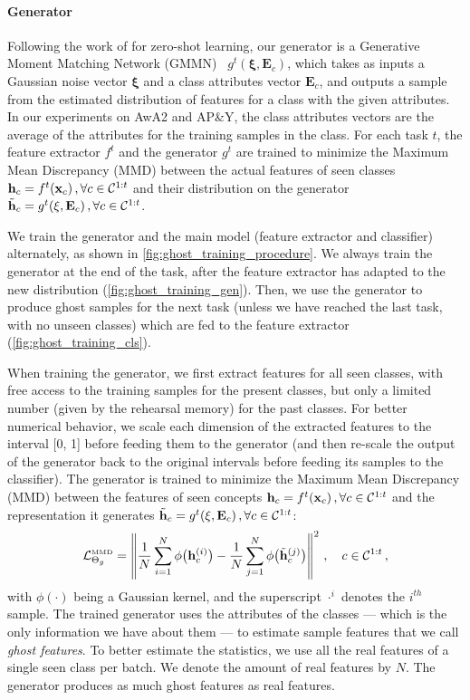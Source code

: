 \paragraph{Generator} Following the work of \cite{bucher2017zeroshot_gmmn} for zero-shot
learning, our generator is a Generative Moment Matching Network (GMMN)~\cite{li2015gmmn}
$g^t(\mathbf{\xi}, \mathbf{E}_c)$, which takes as inputs a Gaussian noise vector $\mathbf{\xi}$ and
a class attributes vector $\mathbf{E}_c$, and outputs a sample from the estimated distribution of
features for a class with the given attributes. In our experiments on AwA2 and AP\&Y, the class
attributes vectors are the average of the attributes for the training samples in the class. For each
task $t$, the feature extractor $f^t$ and the generator $g^t$ are trained to minimize the Maximum
Mean Discrepancy (MMD) \citep{gretton2007twosampleMMD,gretton2012twosampletestMMD} between the
actual features of seen classes $\mathbf{h}_c = f^t(\mathbf{x}_c) \, , \forall c \in \mathcal{C}^{1:t}$ and their
distribution on the generator $\tilde{\mathbf{h}}_c = g^t(\mathbf{\xi}, \mathbf{E}_{c}) \,, \forall c \in
    \mathcal{C}^{1:t}$.

We train the generator and the main model (feature extractor and classifier) alternately, as shown
in \autoref{fig:ghost_training_procedure}. We always train the generator at the end of the task,
after the feature extractor has adapted to the new distribution (\autoref{fig:ghost_training_gen}).
Then, we use the generator to produce ghost samples for the next task (unless we have reached the
last task, with no unseen classes) which are fed to the feature extractor
(\autoref{fig:ghost_training_cls}).

When training the generator, we first extract features for all seen classes, with free access to the
training samples for the present classes, but only a limited number (given by the rehearsal memory)
for the past classes. For better numerical behavior, we scale each dimension of the extracted
features to the interval [0, 1] before feeding them to the generator (and then re-scale the output
of the generator back to the original intervals before feeding its samples to the classifier). The
generator is trained to minimize the Maximum Mean Discrepancy (MMD) between the features of seen
concepts $\mathbf{h}_c = f^t(\mathbf{x}_c) \, , \forall c \in \mathcal{C}^{1:t}$ and the representation it generates
$\tilde{\mathbf{h}}_c = g^t(\mathbf{\xi}, \mathbf{E}_{c}) \,, \forall c \in \mathcal{C}^{1:t}$:
%
\begin{equation}
    \mathcal{L}^\text{\tiny{MMD}}_{\Theta_g} = \left\Vert \frac{1}{N} \sum_{i=1}^N \phi\big(\mathbf{h}^{(i)}_c\big) - \frac{1}{N} \sum_{j=1}^N \phi\big(\tilde{\mathbf{h}}^{(j)}_c\big) \right\Vert^2\,, \quad c \in \mathcal{C}^{1:t}\,,
    \label{eq:mmd_loss}
\end{equation}
%
\noindent with $\phi(\cdot)$ being a Gaussian kernel, and the superscript $\cdot^i$ denotes the
$i^{th}$ sample. The trained generator uses the attributes of the classes
— which is the only information we have about them — to estimate sample features that we call
\textit{ghost features}. To better estimate the statistics, we use all the real features of a single
seen class per batch. We denote the amount of real features by $N$. The generator produces as much
ghost features as real features.

